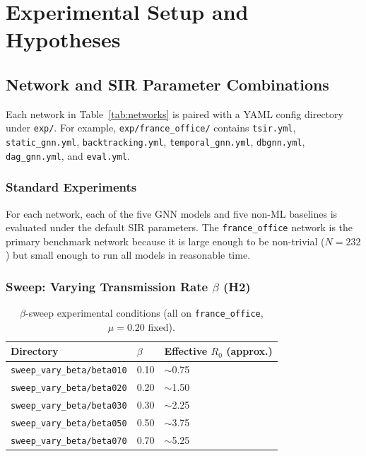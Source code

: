 \documentclass[12pt,a4paper]{report}
\begin{document}
\chapter{Experimental Setup and Hypotheses}
\label{chap:experiments}

\section{Network and SIR Parameter Combinations}

Each network in Table~\ref{tab:networks} is paired with a YAML config directory
under \texttt{exp/}. For example, \texttt{exp/france\_office/} contains
\texttt{tsir.yml}, \texttt{static\_gnn.yml}, \texttt{backtracking.yml},
\texttt{temporal\_gnn.yml}, \texttt{dbgnn.yml}, \texttt{dag\_gnn.yml}, and
\texttt{eval.yml}.

\subsection{Standard Experiments}

For each network, each of the five GNN models and five non-ML baselines is
evaluated under the default SIR parameters. The \texttt{france\_office} network
is the primary benchmark network because it is large enough to be non-trivial
($N=232$) but small enough to run all models in reasonable time.

\subsection{Sweep: Varying Transmission Rate $\beta$ (H2)}

\begin{table}[H]
\centering
\caption{$\beta$-sweep experimental conditions (all on \texttt{france\_office},
  $\mu = 0.20$ fixed).}
\label{tab:beta_sweep}
\begin{tabular}{lll}
\toprule
Directory & $\beta$ & Effective $R_0$ (approx.) \\
\midrule
\texttt{sweep\_vary\_beta/beta010} & 0.10 & $\sim$0.75 \\
\texttt{sweep\_vary\_beta/beta020} & 0.20 & $\sim$1.50 \\
\texttt{sweep\_vary\_beta/beta030} & 0.30 & $\sim$2.25 \\
\texttt{sweep\_vary\_beta/beta050} & 0.50 & $\sim$3.75 \\
\texttt{sweep\_vary\_beta/beta070} & 0.70 & $\sim$5.25 \\
\bottomrule
\end{tabular}
\end{table}
\end{document}
